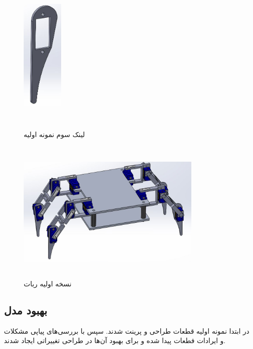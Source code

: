 	\begin{figure}[!h]	
	\vspace{0.2cm}
	\centering
	\includegraphics[height=7cm,width=2cm]{./Images/CH2/Link3_First.JPG}
	‌\caption{لینک سوم نمونه اولیه}
	\label{لینک سوم نمونه اولیه}
	\end{figure}
	
	\begin{figure}[!h]	
	\vspace{0.2cm}
	\centering
	\includegraphics[height=7cm,width=9cm]{./Images/CH2/Robot_First.JPG}
	\caption{نسخه اولیه ربات}
	\label{نسخه اولیه ربات}
	\end{figure}

\subsection{بهبود مدل}
در ابتدا نمونه اولیه قطعات طراحی و پرینت شدند. سپس با بررسی‌های پیاپی مشکلات و ایرادات فطعات پیدا شده و برای بهبود آن‌ها در طراحی تغییراتی ایجاد شدند. 
  
